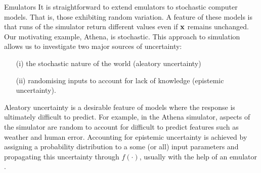 \begin{chapter}{Emulators \label{Ch:Emulators}}
It is straightforward to extend emulators to stochastic computer models. That is, those exhibiting random variation. A feature of these models is that runs of the simulator return different values even if $\mathbf{x}$ remains unchanged. Our motivating example, Athena, is stochastic. This approach to simulation allows us to investigate two major sources of uncertainty:
\begin{itemize}
  \item[(i)] the stochastic nature of the world (aleatory uncertainty)
  \item[(ii)] randomising inputs to account for lack of knowledge (epistemic uncertainty).
\end{itemize}
Aleatory uncertainty is a desirable feature of models where the response is ultimately difficult to predict. For example, in the Athena simulator, aspects of the simulator are random to account for difficult to predict features such as weather and human error. Accounting for epistemic uncertainty is achieved by assigning a probability distribution to a some (or all) input parameters and propagating this uncertainty through $f(\cdot)$, usually with the help of an emulator \citep{Oakley04}.


\end{chapter}

